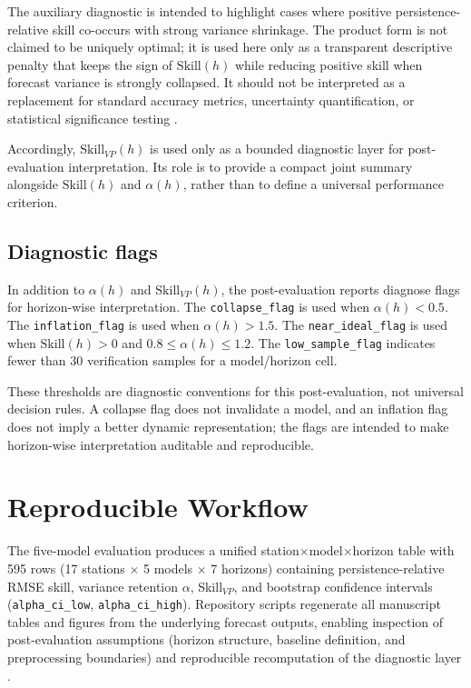 \documentclass[3p,times,single-column]{elsarticle}
\begin{document}
The auxiliary diagnostic is intended to highlight cases where positive persistence-relative skill co-occurs with strong variance shrinkage. The product form is not claimed to be uniquely optimal; it is used here only as a transparent descriptive penalty that keeps the sign of \(\mathrm{Skill}(h)\) while reducing positive skill when forecast variance is strongly collapsed. It should not be interpreted as a replacement for standard accuracy metrics, uncertainty quantification, or statistical significance testing \cite{diebold1995}.

Accordingly, \(\mathrm{Skill}_{VP}(h)\) is used only as a bounded diagnostic layer for post-evaluation interpretation. Its role is to provide a compact joint summary alongside \(\mathrm{Skill}(h)\) and \(\alpha(h)\), rather than to define a universal performance criterion.

\subsection{Diagnostic flags}
In addition to \(\alpha(h)\) and \(\mathrm{Skill}_{VP}(h)\), the post-evaluation reports diagnose flags for horizon-wise interpretation. The \texttt{collapse\_flag} is used when \(\alpha(h) < 0.5\). The \texttt{inflation\_flag} is used when \(\alpha(h) > 1.5\). The \texttt{near\_ideal\_flag} is used when \(\mathrm{Skill}(h)>0\) and \(0.8 \leq \alpha(h) \leq 1.2\). The \texttt{low\_sample\_flag} indicates fewer than 30 verification samples for a model/horizon cell.

These thresholds are diagnostic conventions for this post-evaluation, not universal decision rules. A collapse flag does not invalidate a model, and an inflation flag does not imply a better dynamic representation; the flags are intended to make horizon-wise interpretation auditable and reproducible.

\section{Reproducible Workflow}

The five-model evaluation produces a unified station$\times$model$\times$horizon table with 595 rows (17 stations $\times$ 5 models $\times$ 7 horizons) containing persistence-relative RMSE skill, variance retention $\alpha$, Skill$_{VP}$, and bootstrap confidence intervals (\texttt{alpha\_ci\_low}, \texttt{alpha\_ci\_high}). Repository scripts regenerate all manuscript tables and figures from the underlying forecast outputs, enabling inspection of post-evaluation assumptions (horizon structure, baseline definition, and preprocessing boundaries) and reproducible recomputation of the diagnostic layer \cite{sandve2013}.
\end{document}
